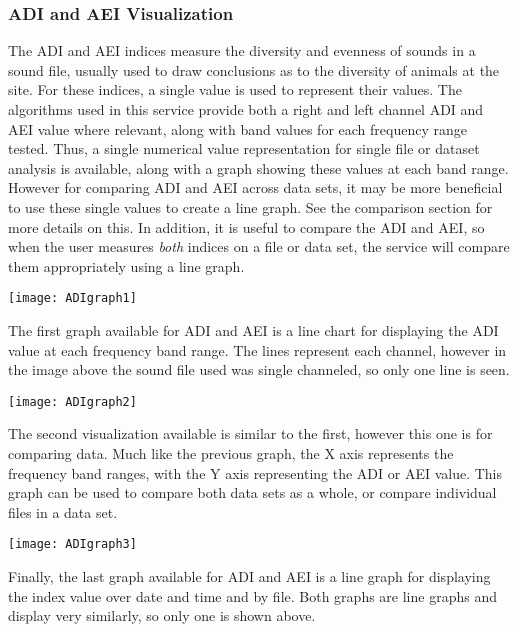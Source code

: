 \subsubsection{ADI and AEI Visualization}
The ADI and AEI indices measure the diversity and evenness of sounds in a sound file, usually used to draw conclusions as to the diversity of animals at the site. For these indices, a single value is used to represent their values. The algorithms used in this service provide both a right and left channel ADI and AEI value where relevant, along with band values for each frequency range tested. Thus, a single numerical value representation for single file or dataset analysis is available, along with a graph showing these values at each band range. However for comparing ADI and AEI across data sets, it may be more beneficial to use these single values to create a line graph. See the comparison section for more details on this. In addition, it is useful to compare the ADI and AEI, so when the user measures \textit{both} indices on a file or data set, the service will compare them appropriately using a line graph.\\

\begin{center}
	\texttt{[image: ADIgraph1]} \\[12pt]
\end{center}
The first graph available for ADI and AEI is a line chart for displaying the ADI value at each frequency band range. The lines represent each channel, however in the image above the sound file used was single channeled, so only one line is seen.\\

\begin{center}
	\texttt{[image: ADIgraph2]} \\[12pt]
\end{center}
The second visualization available is similar to the first, however this one is for comparing data. Much like the previous graph, the X axis represents the frequency band ranges, with the Y axis representing the ADI or AEI value. This graph can be used to compare both data sets as a whole, or compare individual files in a data set.\\

\begin{center}
	\texttt{[image: ADIgraph3]} \\[12pt]
\end{center}
Finally, the last graph available for ADI and AEI is a line graph for displaying the index value over date and time and by file. Both graphs are line graphs and display very similarly, so only one is shown above.
